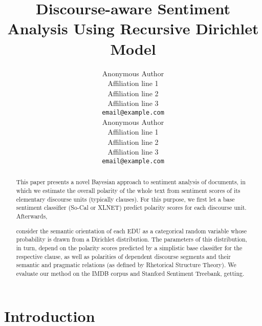 \documentclass[11pt]{article}
\title{Discourse-aware Sentiment Analysis Using Recursive Dirichlet
  Model}
\author{Anonymous Author\\
  Affiliation line 1 \\
  Affiliation line 2 \\
  Affiliation line 3 \\
  {\tt email@example.com} \\\And{}
  Anonymous Author\\
  Affiliation line 1 \\
  Affiliation line 2 \\
  Affiliation line 3 \\
  {\tt email@example.com} \\}
\date{}
\newcommand{\ienocomma}{\textit{i.e.}}
\newcommand{\ie}{\ienocomma,}
\begin{document}
\maketitle
\begin{abstract}
  This paper presents a novel Bayesian approach to sentiment analysis
  of documents, in which we estimate the overall polarity of the whole
  text from sentiment scores of its elementary discourse units
  (typically clauses).  For this purpose, we first let a base
  sentiment classifier (So-Cal or XLNET) predict polarity scores for
  each discourse unit.  Afterwards,

  consider the semantic orientation of each EDU as a
  categorical random variable whose probability is drawn from a
  Dirichlet distribution.  The parameters of this distribution, in
  turn, depend on the polarity scores predicted by a simplistic base
  classifier for the respective clause, as well as polarities of
  dependent discourse segments and their semantic and pragmatic
  relations (as defined by Rhetorical Structure Theory).  We evaluate
  our method on the IMDB corpus and Stanford Sentiment Treebank,
  getting.
\end{abstract}

\section{Introduction}\label{intro}

\end{document}
